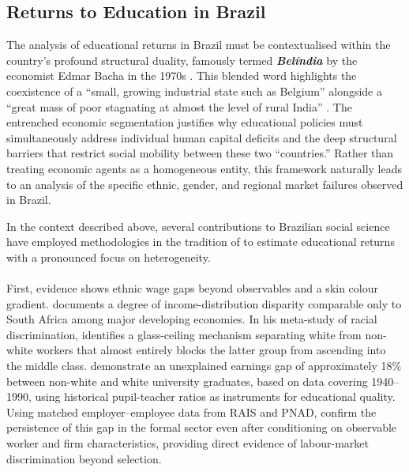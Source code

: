 \subsection{Returns to Education in Brazil}
\label{subsec:brazil_returns}
The analysis of educational returns in Brazil must be contextualised within the country's profound structural duality, famously termed \textbf{\emph{Belíndia}} by the economist Edmar Bacha in the 1970s \cite[p.~19]{Telles2004}. This blended word highlights the coexistence of a ``small, growing industrial state such as Belgium'' alongside a ``great mass of poor stagnating at almost the level of rural India'' \cite{bacha1976}. The entrenched economic segmentation justifies why educational policies must simultaneously address individual human capital deficits and the deep structural barriers that restrict social mobility between these two ``countries.'' Rather than treating economic agents as a homogeneous entity, this framework naturally leads to an analysis of the specific ethnic, gender, and regional market failures observed in Brazil.

In the context described above, several contributions to Brazilian social science have employed methodologies in the tradition of  to estimate educational returns with a pronounced focus on heterogeneity.
\paragraph{}
First, evidence shows ethnic wage gaps beyond observables and a skin colour gradient.  documents a degree of income-distribution disparity comparable only to South Africa among major developing economies. In his meta-study of racial discrimination,  identifies a glass-ceiling mechanism separating white from non-white workers that almost entirely blocks the latter group from ascending into the middle class.  demonstrate an unexplained earnings gap of approximately 18\% between non-white and white university graduates, based on data covering 1940--1990, using historical pupil-teacher ratios as instruments for educational quality. Using matched employer--employee data from RAIS and PNAD,  confirm the persistence of this gap in the formal sector even after conditioning on observable worker and firm characteristics, providing direct evidence of labour-market discrimination beyond selection.
